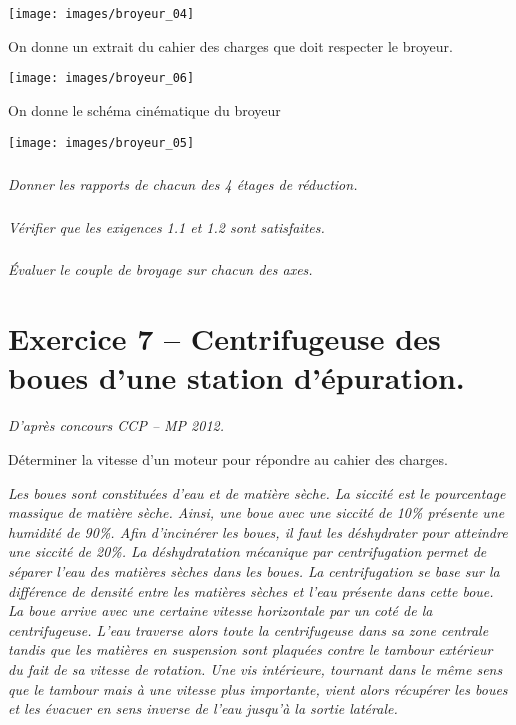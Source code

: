 \documentclass[10pt,fleqn]{article} %
\begin{document}
\begin{multicols}{2}
\begin{center}
\texttt{[image: images/broyeur\_04]}
\end{center}

On donne un extrait du cahier des charges que doit respecter le broyeur.


\begin{center}
\texttt{[image: images/broyeur\_06]}
\end{center}

On donne le schéma cinématique du broyeur
\begin{center}
\texttt{[image: images/broyeur\_05]}
\end{center}

\subparagraph{}\textit{Donner les rapports de chacun des 4 étages de réduction.}


\subparagraph{}\textit{Vérifier que les exigences 1.1 et 1.2 sont satisfaites.}

\subparagraph{}\textit{Évaluer le couple de broyage sur chacun des axes.}



\section*{Exercice 7 -- Centrifugeuse des boues d'une station d'épuration.}
\setcounter{exo}{0}
\textit{D'après concours CCP -- MP 2012.}

\begin{obj} Déterminer la vitesse d'un moteur pour répondre au cahier des charges. 
\end{obj}

\footnotesize{
\textit{Les boues sont constituées d’eau et de matière sèche. La siccité est le pourcentage massique de matière
sèche. Ainsi, une boue avec une siccité de 10\% présente une humidité de 90\%. Afin
d’incinérer les boues, il faut les déshydrater pour atteindre une siccité de 20\%. La déshydratation
mécanique par centrifugation permet de séparer l’eau des matières sèches dans les boues.
La centrifugation se base sur la différence de densité entre les matières sèches et l’eau présente dans
cette boue. La boue arrive avec une certaine vitesse horizontale par un coté de la centrifugeuse. L’eau 
traverse alors toute la centrifugeuse dans sa
zone centrale tandis que les matières en suspension sont plaquées contre le tambour extérieur du fait
de sa vitesse de rotation. Une vis intérieure, tournant dans le même sens que le tambour mais à une
vitesse plus importante, vient alors récupérer les boues et les évacuer en sens inverse de l’eau jusqu’à
la sortie latérale.}}



\end{multicols}
\end{document}
